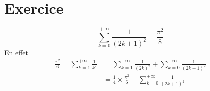 \part{Exercice}

\[
	\sum_{k=0}^{+\infty} \frac{1}{(2k+1)^2} = \frac{\pi^2}{8}
\] En effet
\begin{align*}
	\frac{\pi^2}{6} = \sum_{k=1}^{+\infty} \frac{1}{k^2} &= \sum_{k=1}^{+\infty} \frac{1}{(2k)^2} + \sum_{k=0}^{+\infty} \frac{1}{(2k+1)^2}\\
	&= \frac{1}{4} \times \frac{\pi^2}{6} + \sum_{k=0}^{+\infty} \frac{1}{(2k+1)^2} \\
\end{align*}


